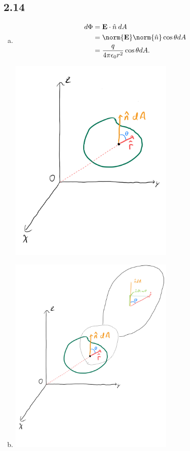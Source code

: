\documentclass[12pt]{mypackage}
\begin{document}
\subsection{2.14}%
\begin{enumerate}[(a)]
  \item 
    \begin{align*}
      d\Phi &= \mathbf{E}\cdot \hat{n}\: dA\\
            &= \norm{\mathbf{E}}\norm{\hat{n}}\cos\theta dA\\
            &= \frac{q}{4\pi\epsilon_0 r^2}\cos\theta dA.
    \end{align*}
    \begin{center}
      \includegraphics[width=8cm]{images/p_1a_1_2-14a}
    \end{center}
    \item\hfill
      \begin{center}
        \includegraphics[width=8cm]{images/p_1a_1_2-14b}

\end{center}
\end{enumerate}
\end{document}

